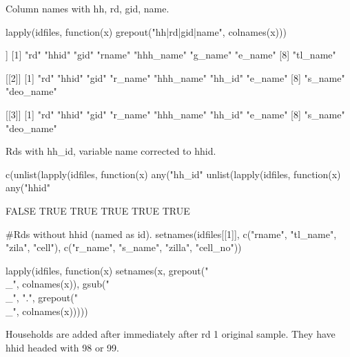 \begin{Schunk}
\end{Schunk}
Column names with hh, rd, gid, name.
\begin{Schunk}
\begin{Sinput}
lapply(idfiles, function(x) grepout("hh|rd|gid|name", colnames(x)))
\end{Sinput}
\begin{Soutput}
[[1]]
[1] "rd"       "hhid"     "gid"      "rname"    "hhh_name" "g_name"   "e_name"  
[8] "tl_name" 

[[2]]
[1] "rd"       "hhid"     "gid"      "r_name"   "hhh_name" "hh_id"    "e_name"  
[8] "s_name"   "deo_name"

[[3]]
[1] "rd"       "hhid"     "gid"      "r_name"   "hhh_name" "hh_id"    "e_name"  
[8] "s_name"   "deo_name"
\end{Soutput}
\end{Schunk}
Rds with \textsf{hh\_id}, variable name corrected to \textsf{hhid}.
\begin{Schunk}
\begin{Sinput}
c(unlist(lapply(idfiles, function(x) any("hh_id" %in% colnames(x)))),
unlist(lapply(idfiles, function(x) any("hhid" %in% colnames(x)))))
\end{Sinput}
\begin{Soutput}
[1] FALSE  TRUE  TRUE  TRUE  TRUE  TRUE
\end{Soutput}
\begin{Sinput}
#Rds without \textsf{hhid} (named as \textsf{id}).
setnames(idfiles[[1]], c("rname", "tl_name", "zila", "cell"), 
	c("r_name", "s_name", "zilla", "cell_no"))
\end{Sinput}
\end{Schunk}
\begin{Schunk}
\begin{Sinput}
lapply(idfiles, function(x) 
	setnames(x, grepout("\\_", colnames(x)), gsub("\\_", ".", grepout("\\_", colnames(x)))))
\end{Sinput}
\end{Schunk}
Households are added after immediately after rd 1 original sample. They have hhid headed with 98 or 99. 


